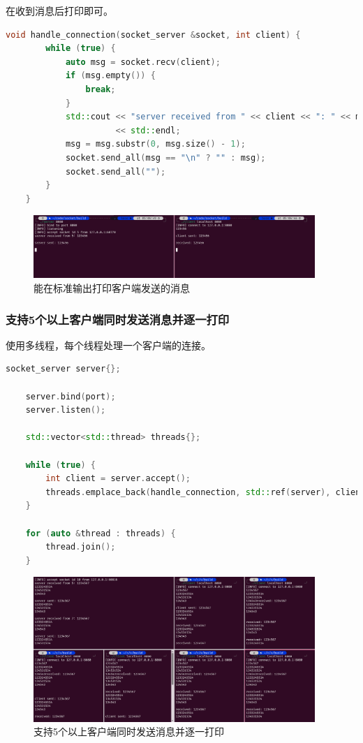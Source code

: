 \documentclass{article}
\begin{document}
在收到消息后打印即可。

\begin{lstlisting}[language=C++]
    void handle_connection(socket_server &socket, int client) {
        while (true) {
            auto msg = socket.recv(client);
            if (msg.empty()) {
                break;
            }
            std::cout << "server received from " << client << ": " << msg
                      << std::endl;
            msg = msg.substr(0, msg.size() - 1);
            socket.send_all(msg == "\n" ? "" : msg);
            socket.send_all("");
        }
    }
\end{lstlisting}

\begin{figure}[H]
    \centering
    \includegraphics[width=0.95\textwidth]{img/1.png}
    \caption{能在标准输出打印客户端发送的消息}
\end{figure}

\subsubsection{支持5个以上客户端同时发送消息并逐一打印}

使用多线程，每个线程处理一个客户端的连接。

\begin{lstlisting}[language=C++]
    socket_server server{};

    server.bind(port);
    server.listen();

    std::vector<std::thread> threads{};

    while (true) {
        int client = server.accept();
        threads.emplace_back(handle_connection, std::ref(server), client);
    }

    for (auto &thread : threads) {
        thread.join();
    }
\end{lstlisting}

\begin{figure}[H]
    \centering
    \includegraphics[width=0.95\textwidth]{img/2.png}
    \caption{支持5个以上客户端同时发送消息并逐一打印}
\end{figure}
\end{document}
